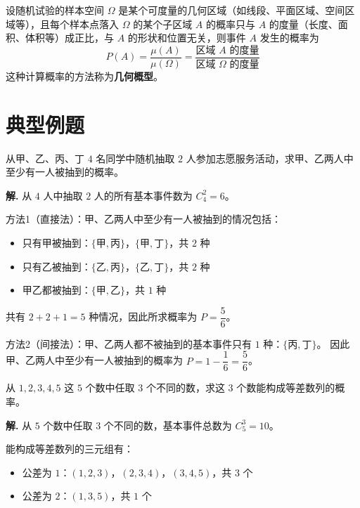 \documentclass[11pt]{ctexrep}
\begin{document}
\begin{definition}[几何概率]
    设随机试验的样本空间 $\Omega$ 是某个可度量的几何区域（如线段、平面区域、空间区域等），且每个样本点落入 $\Omega$ 的某个子区域 $A$ 的概率只与 $A$ 的度量（长度、面积、体积等）成正比，与 $A$ 的形状和位置无关，则事件 $A$ 发生的概率为
    \[
        P(A) = \frac{\mu(A)}{\mu(\Omega)} = \frac{\text{区域 } A \text{ 的度量}}{\text{区域 } \Omega \text{ 的度量}}
    \]
    这种计算概率的方法称为\textbf{几何概型}。
\end{definition}

\section*{典型例题}

\begin{example}[古典概率基础计算]
    从甲、乙、丙、丁 $4$ 名同学中随机抽取 $2$ 人参加志愿服务活动，求甲、乙两人中至少有一人被抽到的概率。
\end{example}

\textbf{解.} 从 $4$ 人中抽取 $2$ 人的所有基本事件数为 $C_4^2 = 6$。

方法1（直接法）：甲、乙两人中至少有一人被抽到的情况包括：
\begin{itemize}
    \item 只有甲被抽到：$\{\text{甲}, \text{丙}\}$，$\{\text{甲}, \text{丁}\}$，共 $2$ 种
    \item 只有乙被抽到：$\{\text{乙}, \text{丙}\}$，$\{\text{乙}, \text{丁}\}$，共 $2$ 种
    \item 甲乙都被抽到：$\{\text{甲}, \text{乙}\}$，共 $1$ 种
\end{itemize}

共有 $2 + 2 + 1 = 5$ 种情况，因此所求概率为 $P = \dfrac{5}{6}$。

方法2（间接法）：甲、乙两人都不被抽到的基本事件只有 $1$ 种：$\{\text{丙}, \text{丁}\}$。
因此甲、乙两人中至少有一人被抽到的概率为 $P = 1 - \dfrac{1}{6} = \dfrac{5}{6}$。

\begin{example}[古典概率与排列组合]
    从 $1, 2, 3, 4, 5$ 这 $5$ 个数中任取 $3$ 个不同的数，求这 $3$ 个数能构成等差数列的概率。
\end{example}

\textbf{解.} 从 $5$ 个数中任取 $3$ 个不同的数，基本事件总数为 $C_5^3 = 10$。

能构成等差数列的三元组有：
\begin{itemize}
    \item 公差为 $1$：$(1, 2, 3)$，$(2, 3, 4)$，$(3, 4, 5)$，共 $3$ 个
    \item 公差为 $2$：$(1, 3, 5)$，共 $1$ 个
\end{itemize}
\end{document}
